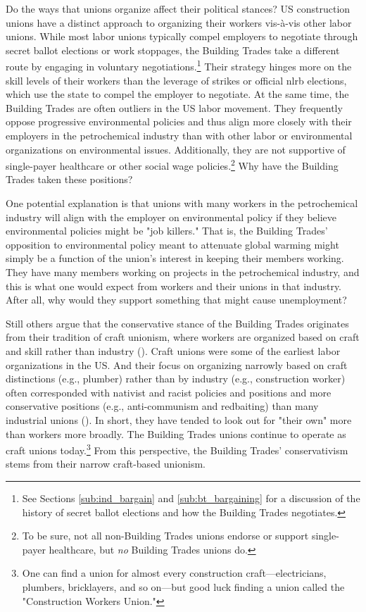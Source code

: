 \documentclass[12pt]{article}
\begin{document}
Do the ways that unions organize aﬀect their political stances? US construction unions have a distinct approach to organizing their workers vis-à-vis other labor unions. While most labor unions typically compel employers to negotiate through secret ballot elections or work stoppages, the Building Trades take a different route by engaging in voluntary negotiations.\footnote{See Sections \ref{sub:ind_bargain} and \ref{sub:bt_bargaining} for a discussion of the history of secret ballot elections and how the Building Trades negotiates.} Their strategy hinges more on the skill levels of their workers than the leverage of strikes or official \acrfull{nlrb} elections, which use the state to compel the employer to negotiate. At the same time, the Building Trades are often outliers in the US labor movement. They frequently oppose progressive environmental policies and thus align more closely with their employers in the petrochemical industry than with other labor or environmental organizations on environmental issues. Additionally, they are not supportive of single-payer healthcare or other social wage policies.\footnote{To be sure, not all non-Building Trades unions endorse or support single-payer healthcare, but \emph{no} Building Trades unions do.} Why have the Building Trades taken these positions?

One potential explanation is that unions with many workers in the petrochemical industry will align with the employer on environmental policy if they believe environmental policies might be "job killers." That is, the Building Trades' opposition to environmental policy meant to attenuate global warming might simply be a function of the union's interest in keeping their members working. They have many members working on projects in the petrochemical industry, and this is what one would expect from workers and their unions in that industry. After all, why would they support something that might cause unemployment?

Still others argue that the conservative stance of the Building Trades originates from their tradition of craft unionism, where workers are organized based on craft and skill rather than industry (\cite{roginComment1974, perlmanHistoryTradeUnionism1922, issermanGodBlessOur1976, fonerHistoryLaborMovement1996}). Craft unions were some of the earliest labor organizations in the US. And their focus on organizing narrowly based on craft distinctions (e.g., plumber) rather than by industry (e.g., construction worker) often corresponded with nativist and racist policies and positions and more conservative positions (e.g., anti-communism and redbaiting) than many industrial unions (\cite{fonerHistoryLaborMovement1994}). In short, they have tended to look out for "their own" more than workers more broadly. The Building Trades unions continue to operate as craft unions today.\footnote{One can find a union for almost every construction craft---electricians, plumbers, bricklayers, and so on---but good luck finding a union called the "Construction Workers Union."} From this perspective, the Building Trades' conservativism stems from their narrow craft-based unionism.
\end{document}
